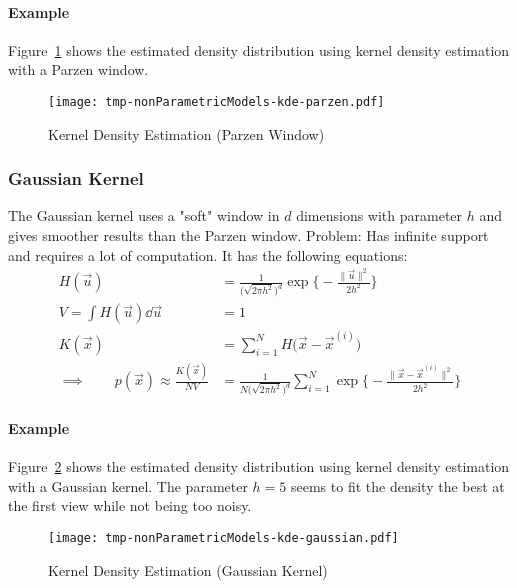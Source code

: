 				\paragraph{Example}
					Figure~\ref{fig:kdeParzen} shows the estimated density distribution using kernel density estimation with a Parzen window.

					\begin{figure} 
						\centering
						\texttt{[image: tmp-nonParametricModels-kde-parzen.pdf]}
						\caption{Kernel Density Estimation (Parzen Window)}
						\label{fig:kdeParzen}
					\end{figure}

			\subsubsection{Gaussian Kernel}
				The Gaussian kernel uses a "soft" window in \(d\) dimensions with parameter \(h\) and gives smoother results than the Parzen window. Problem: Has infinite support and requires a lot of computation. It has the following equations:
				\begin{align}
					H(\vec{u}) &= \frac{1}{\big(\sqrt{2 \pi h^2}\big)^d} \exp\Bigg\{ -\frac{\lVert \vec{u} \rVert^2}{2h^2} \Bigg\} \\
					V = \int H(\vec{u}) \dd{\vec{u}} &= 1 \\
					K(\vec{x}) &= \sum_{i = 1}^{N} H\big(\vec{x} - \vec{x}^{(i)}\big) \\
					\implies\qquad p(\vec{x}) \approx \frac{K(\vec{x})}{NV} &= \frac{1}{N\big(\sqrt{2 \pi h^2}\big)^d} \sum_{i = 1}^{N} \exp\Bigg\{ -\frac{\lVert \vec{x} - \vec{x}^{(i)} \rVert^2}{2h^2} \Bigg\}
				\end{align}

				\paragraph{Example}
					Figure~\ref{fig:kdeGaussian} shows the estimated density distribution using kernel density estimation with a Gaussian kernel. The parameter \( h = 5 \) seems to fit the density the best at the first view while not being too noisy.

					\begin{figure}
						\centering
						\texttt{[image: tmp-nonParametricModels-kde-gaussian.pdf]}
						\caption{Kernel Density Estimation (Gaussian Kernel)}
						\label{fig:kdeGaussian}
					\end{figure}

